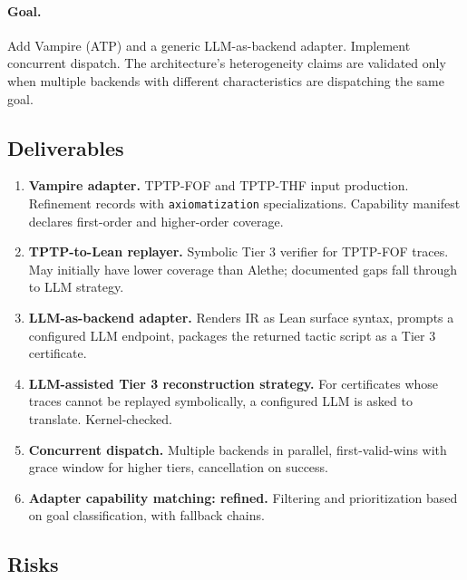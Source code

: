 \documentclass[11pt,letterpaper]{article}
\begin{document}
\paragraph{Goal.} Add Vampire (ATP) and a generic LLM-as-backend
adapter. Implement concurrent dispatch. The architecture's heterogeneity
claims are validated only when multiple backends with different
characteristics are dispatching the same goal.

\subsection{Deliverables}

\begin{enumerate}
  \item \textbf{Vampire adapter.} TPTP-FOF and TPTP-THF input
        production. Refinement records with \texttt{axiomatization}
        specializations. Capability manifest declares first-order and
        higher-order coverage.
  \item \textbf{TPTP-to-Lean replayer.} Symbolic Tier 3 verifier for
        TPTP-FOF traces. May initially have lower coverage than Alethe;
        documented gaps fall through to LLM strategy.
  \item \textbf{LLM-as-backend adapter.} Renders IR as Lean surface
        syntax, prompts a configured LLM endpoint, packages the
        returned tactic script as a Tier 3 certificate.
  \item \textbf{LLM-assisted Tier 3 reconstruction strategy.} For
        certificates whose traces cannot be replayed symbolically, a
        configured LLM is asked to translate. Kernel-checked.
  \item \textbf{Concurrent dispatch.} Multiple backends in parallel,
        first-valid-wins with grace window for higher tiers, cancellation
        on success.
  \item \textbf{Adapter capability matching: refined.} Filtering and
        prioritization based on goal classification, with fallback
        chains.
\end{enumerate}

\subsection{Risks}
\end{document}
